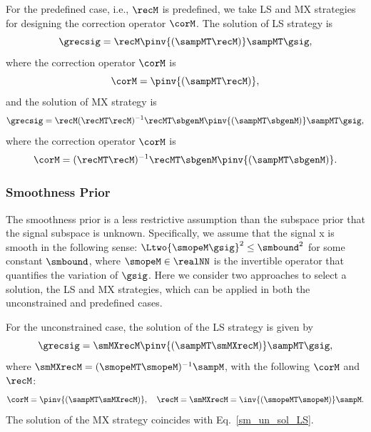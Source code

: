 \documentclass[journal]{IEEEtran}
\begin{document}
For the predefined case, i.e., $\recM$ is predefined, we take LS and MX strategies for designing the correction operator $\corM$.
The solution of LS strategy is
\begin{equation}\label{sb_sol_LS}
    \grecsig = \recM \pinv{(\sampMT \recM)} \sampMT \gsig,
\end{equation}
where the correction operator $\corM$ is
\begin{equation}\label{sb_corM_LS}
    \corM = \pinv{(\sampMT \recM)},
\end{equation}
and the solution of MX strategy is
\begin{equation}\label{sb_sol_MX}
    \grecsig = \recM (\recMT\recM)^{-1}\recMT\sbgenM \pinv{(\sampMT\sbgenM)} \sampMT \gsig,
\end{equation}
where the correction operator $\corM$ is
\begin{equation}\label{sb_corM_MX}
    \corM = (\recMT\recM)^{-1}\recMT\sbgenM\pinv{(\sampMT\sbgenM)}.
\end{equation}

\subsubsection{Smoothness Prior} \label{subsec:pre_sm_priors}
The smoothness prior is a less restrictive assumption than the subspace prior that the signal subspace is unknown. 
Specifically, we assume that the signal x is smooth in the following sense: $\Ltwo{\smopeM \gsig}^{2} \leq \smbound^2$ for some constant $\smbound$, where $\smopeM \in \realNN$ is the invertible operator that quantifies the variation of $\gsig$.
Here we consider two approaches to select a solution, the LS and MX strategies, which can be applied in both the unconstrained and predefined cases.

For the unconstrained case, the solution of the LS strategy is given by
\begin{equation}\label{sm_un_sol_LS}
    \grecsig = \smMXrecM \pinv{(\sampMT\smMXrecM)} \sampMT \gsig,
\end{equation}
where $\smMXrecM = (\smopeMT\smopeM)^{-1}\sampM$, with the following $\corM$ and $\recM$:
\begin{equation} \label{sm_un_corM_recM}
    \corM = \pinv{(\sampMT \smMXrecM)}, \quad
    \recM = \smMXrecM = \inv{(\smopeMT\smopeM)}\sampM.
\end{equation}
The solution of the MX strategy coincides with Eq.~\eqref{sm_un_sol_LS}.
\end{document}

